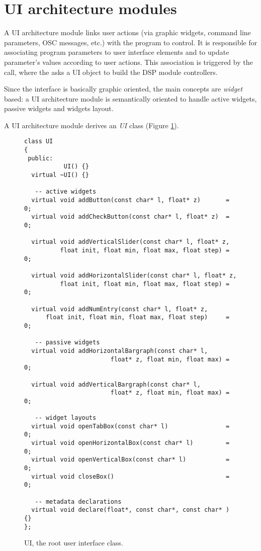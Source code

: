 \section{UI architecture modules} \label{sec:gui}

A UI architecture module links user actions (via graphic widgets, command line parameters, OSC messages, etc.) with the \faust program to control. 
It is responsible for associating program parameters to user interface elements and to update parameter's values according to user actions. This association is triggered by the  call, where the  asks a UI object to build the DSP module controllers.

Since the interface is basically graphic oriented, the main concepts are \emph{widget} based: a UI architecture module is semantically oriented to handle active widgets, passive widgets and widgets layout.

A \faust UI architecture module derives an \emph{UI} class (Figure \ref{tab:ui}). 

\begin{figure}[htp]
\begin{center}
\begin{lstlisting}[basicstyle=\ttfamily\footnotesize\color{yotxt}]
class UI
{
 public:
           UI() {}
  virtual ~UI() {}

   -- active widgets
  virtual void addButton(const char* l, float* z)       = 0;
  virtual void addCheckButton(const char* l, float* z)  = 0;
  
  virtual void addVerticalSlider(const char* l, float* z, 
          float init, float min, float max, float step) = 0;
          
  virtual void addHorizontalSlider(const char* l, float* z, 
          float init, float min, float max, float step) = 0;
          
  virtual void addNumEntry(const char* l, float* z, 
      float init, float min, float max, float step)     = 0;
      
   -- passive widgets
  virtual void addHorizontalBargraph(const char* l,
                        float* z, float min, float max) = 0;
                        
  virtual void addVerticalBargraph(const char* l, 
                        float* z, float min, float max) = 0; 
                        
   -- widget layouts
  virtual void openTabBox(const char* l)                = 0;
  virtual void openHorizontalBox(const char* l)         = 0;
  virtual void openVerticalBox(const char* l)           = 0;
  virtual void closeBox()                               = 0;
        
   -- metadata declarations
  virtual void declare(float*, const char*, const char* ) {}
};
\end{lstlisting} 
\end{center}
\caption{UI, the root user interface class.}
\label{tab:ui}
\end{figure}

